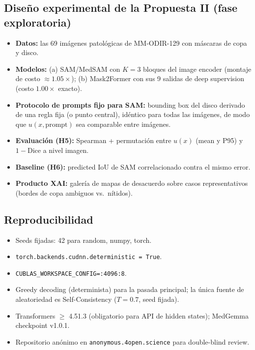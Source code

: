 \documentclass[12pt,a4paper]{article}
\begin{document}
\subsection{Diseño experimental de la Propuesta II (fase exploratoria)}

\begin{itemize}[leftmargin=2em]
    \item \textbf{Datos:} las 69 imágenes patológicas de MM-ODIR-129 con máscaras de copa y disco.
    \item \textbf{Modelos:} (a) SAM/MedSAM con $K=3$ bloques del image encoder (montaje de costo $\approx 1.05\times$); (b) Mask2Former con sus 9 salidas de deep supervision (costo $1.00\times$ exacto).
    \item \textbf{Protocolo de prompts fijo para SAM:} bounding box del disco derivado de una regla fija (o punto central), idéntico para todas las imágenes, de modo que $u(x, \text{prompt})$ sea comparable entre imágenes.
    \item \textbf{Evaluación (H5):} Spearman + permutación entre $u(x)$ (mean y P95) y $1-\mathrm{Dice}$ a nivel imagen.
    \item \textbf{Baseline (H6):} predicted IoU de SAM correlacionado contra el mismo error.
    \item \textbf{Producto XAI:} galería de mapas de desacuerdo sobre casos representativos (bordes de copa ambiguos vs.~nítidos).
\end{itemize}

\subsection{Reproducibilidad}

\begin{itemize}[leftmargin=2em]
    \item Seeds fijadas: 42 para random, numpy, torch.
    \item \texttt{torch.backends.cudnn.deterministic = True}.
    \item \texttt{CUBLAS\_WORKSPACE\_CONFIG=:4096:8}.
    \item Greedy decoding (determinista) para la pasada principal; la única fuente de aleatoriedad es Self-Consistency ($T=0.7$, seed fijada).
    \item Transformers $\geq$ 4.51.3 (obligatorio para API de hidden states); MedGemma checkpoint v1.0.1.
    \item Repositorio anónimo en \texttt{anonymous.4open.science} para double-blind review.
\end{itemize}
\end{document}
